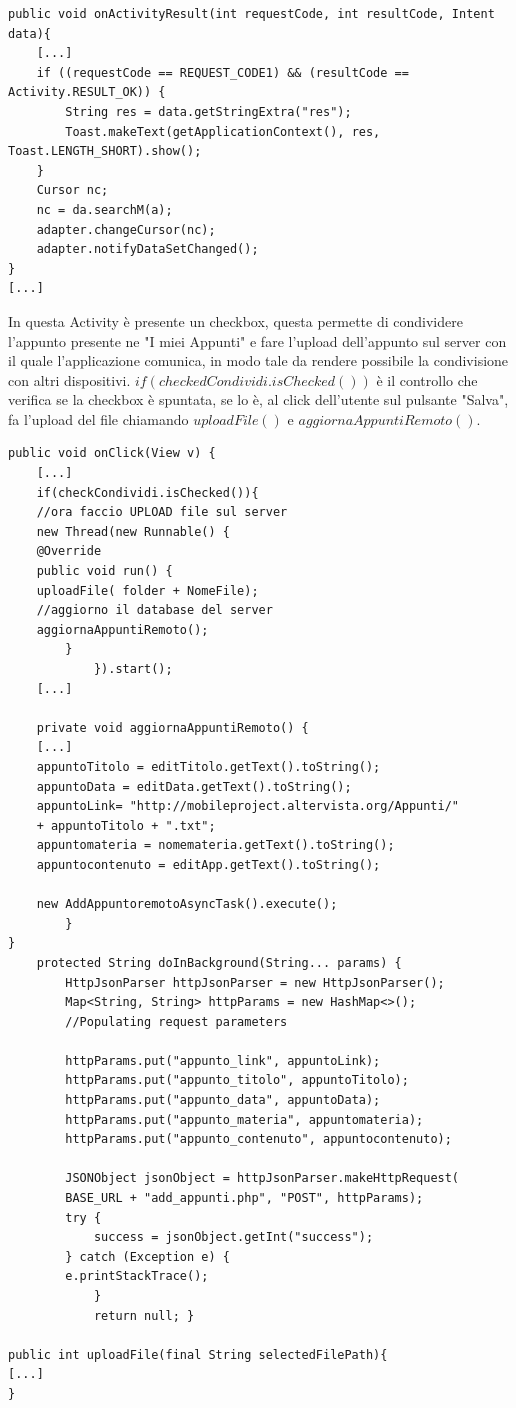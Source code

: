 \documentclass[a4paper, 50pt, twoside]{article}
\begin{document}
\begin{lstlisting}
public void onActivityResult(int requestCode, int resultCode, Intent data){
	[...]
	if ((requestCode == REQUEST_CODE1) && (resultCode == Activity.RESULT_OK)) {
		String res = data.getStringExtra("res");
		Toast.makeText(getApplicationContext(), res, Toast.LENGTH_SHORT).show();
	}
	Cursor nc;
	nc = da.searchM(a);
	adapter.changeCursor(nc);
	adapter.notifyDataSetChanged();
}
[...]
\end{lstlisting}
In questa Activity è presente un checkbox, questa permette di condividere l'appunto presente ne "I miei Appunti" e fare l'upload dell'appunto sul server con il quale l'applicazione comunica, in modo tale da rendere possibile la condivisione con altri dispositivi.
$if(checkedCondividi.isChecked())$ è il controllo che verifica se la checkbox è spuntata, se lo è, al click dell'utente sul pulsante "Salva", fa l'upload del file chiamando $uploadFile()$ e $aggiornaAppuntiRemoto()$.

\begin{lstlisting}
public void onClick(View v) {
	[...]
	if(checkCondividi.isChecked()){
	//ora faccio UPLOAD file sul server
	new Thread(new Runnable() {
	@Override
	public void run() {
	uploadFile( folder + NomeFile);
	//aggiorno il database del server
	aggiornaAppuntiRemoto();
   	 	}
    		}).start();
   	[...]

	private void aggiornaAppuntiRemoto() {
	[...]
	appuntoTitolo = editTitolo.getText().toString();
	appuntoData = editData.getText().toString();
	appuntoLink= "http://mobileproject.altervista.org/Appunti/" 
	+ appuntoTitolo + ".txt";
	appuntomateria = nomemateria.getText().toString();
	appuntocontenuto = editApp.getText().toString();

	new AddAppuntoremotoAsyncTask().execute();
        } 
}
	protected String doInBackground(String... params) {
		HttpJsonParser httpJsonParser = new HttpJsonParser();
		Map<String, String> httpParams = new HashMap<>();
		//Populating request parameters

		httpParams.put("appunto_link", appuntoLink);
		httpParams.put("appunto_titolo", appuntoTitolo);
		httpParams.put("appunto_data", appuntoData);
		httpParams.put("appunto_materia", appuntomateria);
		httpParams.put("appunto_contenuto", appuntocontenuto);

		JSONObject jsonObject = httpJsonParser.makeHttpRequest(
		BASE_URL + "add_appunti.php", "POST", httpParams);
		try {
			success = jsonObject.getInt("success");
		} catch (Exception e) {
		e.printStackTrace();
            }
            return null; }

public int uploadFile(final String selectedFilePath){
[...]
}

\end{lstlisting}
\end{document}
